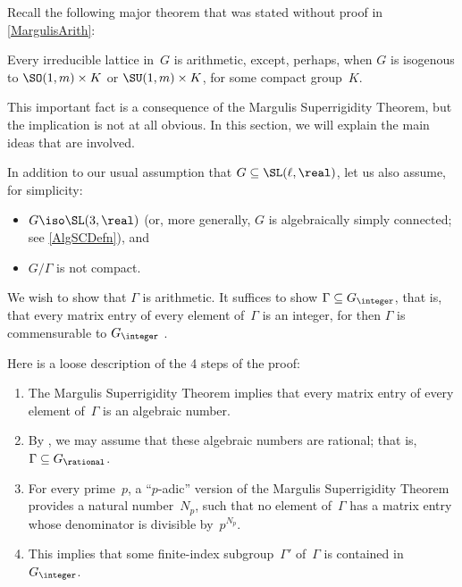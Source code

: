 Recall the following major theorem that was stated without proof in \cref{MargulisArith}:

\begin{namedthm}
\label{MargArithFromSuper}
Every irreducible lattice in~$G$ is arithmetic, except, perhaps, when $G$ is isogenous to\/ $\SO(1,m) \times K$ or\/ $\SU(1,m) \times K$, for some compact group~$K$.
\end{namedthm}

This important fact is a consequence of the Margulis Superrigidity Theorem, but the implication is not at all obvious.  In this section, we will explain the main ideas that are involved.

In addition to our usual assumption that $G \subseteq \SL(\ell,\real)$, let us also assume, for simplicity:
\noprelistbreak
 \begin{itemize}
 \item $G \iso \SL(3,\real)$ (or, more generally, $G$ is algebraically simply connected; see \cref{AlgSCDefn}),
 and 
 \item $G / \Gamma$ is not compact. 
 \end{itemize}
 We wish to show that $\Gamma$ is arithmetic. It suffices to
show $\Gamma  \subseteq G_{\integer}$, that is, that every
matrix entry of every element of~$\Gamma$ is an integer, for
then $\Gamma$ is commensurable to $G_{\integer}$
.

Here is a loose description of the 4 steps of the proof:
	\begin{enumerate}
	\item The Margulis Superrigidity Theorem  implies that every matrix entry of every element of~$\Gamma$ is an algebraic number.
	\item By , we may assume that these algebraic numbers are rational; that is, $\Gamma \subseteq G_{\rational}$.
	\item For every prime~$p$, a ``$p$-adic'' version of the 
	Margulis Superrigidity Theorem 
	provides a natural number~$N_p$, such that no element of~$\Gamma$ has a matrix entry whose denominator is divisible by~$p^{N_p}$. 
	\item This implies that some finite-index subgroup~$\Gamma'$ of~$\Gamma$ is contained in~$G_{\integer}$.
	\end{enumerate}

